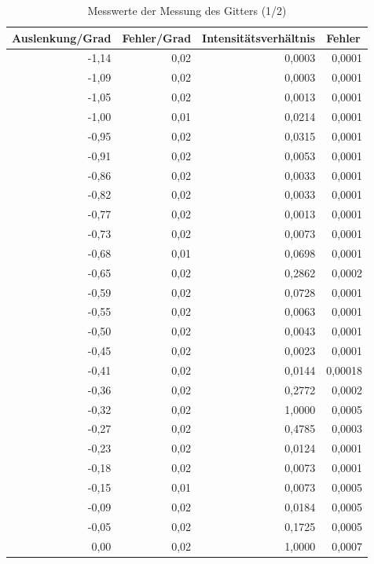 \documentclass[12pt]{scrartcl}
\begin{document}
\begin{table}[H]
\caption{Messwerte der Messung des Gitters (1/2)}
\begin{center}
\begin{tabular}{|r|r|r|r|}
\hline
\multicolumn{1}{|l|}{Auslenkung/Grad} & \multicolumn{1}{l|}{Fehler/Grad} & \multicolumn{1}{l|}{Intensitätsverhältnis} & \multicolumn{1}{l|}{Fehler} \\ \hline
-1,14 & 0,02 & 0,0003 & 0,0001 \\ \hline
-1,09 & 0,02 & 0,0003 & 0,0001 \\ \hline
-1,05 & 0,02 & 0,0013 & 0,0001 \\ \hline
-1,00 & 0,01 & 0,0214 & 0,0001 \\ \hline
-0,95 & 0,02 & 0,0315 & 0,0001 \\ \hline
-0,91 & 0,02 & 0,0053 & 0,0001 \\ \hline
-0,86 & 0,02 & 0,0033 & 0,0001 \\ \hline
-0,82 & 0,02 & 0,0033 & 0,0001 \\ \hline
-0,77 & 0,02 & 0,0013 & 0,0001 \\ \hline
-0,73 & 0,02 & 0,0073 & 0,0001 \\ \hline
-0,68 & 0,01 & 0,0698 & 0,0001 \\ \hline
-0,65 & 0,02 & 0,2862 & 0,0002 \\ \hline
-0,59 & 0,02 & 0,0728 & 0,0001 \\ \hline
-0,55 & 0,02 & 0,0063 & 0,0001 \\ \hline
-0,50 & 0,02 & 0,0043 & 0,0001 \\ \hline
-0,45 & 0,02 & 0,0023 & 0,0001 \\ \hline
-0,41 & 0,02 & 0,0144 & 0,00018 \\ \hline
-0,36 & 0,02 & 0,2772 & 0,0002 \\ \hline
-0,32 & 0,02 & 1,0000 & 0,0005 \\ \hline
-0,27 & 0,02 & 0,4785 & 0,0003 \\ \hline
-0,23 & 0,02 & 0,0124 & 0,0001 \\ \hline
-0,18 & 0,02 & 0,0073 & 0,0001 \\ \hline
-0,15 & 0,01 & 0,0073 & 0,0005 \\ \hline
-0,09 & 0,02 & 0,0184 & 0,0005 \\ \hline
-0,05 & 0,02 & 0,1725 & 0,0005 \\ \hline
0,00 & 0,02 & 1,0000 & 0,0007 \\ \hline
\end{tabular}
\end{center}
\label{tab:a_4_e_a}
\end{table}
\end{document}
